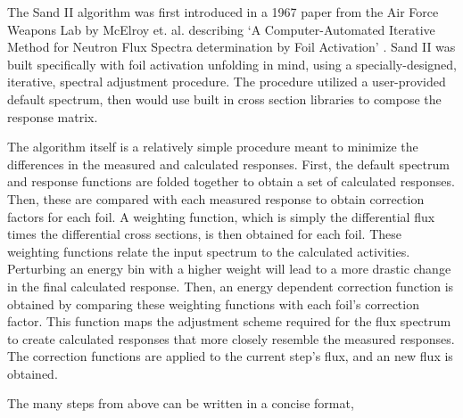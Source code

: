The Sand II algorithm was first introduced in a 1967 paper from the Air Force Weapons Lab by McElroy et. al. describing `A Computer-Automated Iterative Method for Neutron Flux Spectra determination by Foil Activation' \cite{mcelroy1967computer}.
Sand II was built specifically with foil activation unfolding in mind, using a specially-designed, iterative, spectral adjustment procedure.
The procedure utilized a user-provided default spectrum, then would use built in cross section libraries to compose the response matrix.

The algorithm itself is a relatively simple procedure meant to minimize the differences in the measured and calculated responses.
First, the default spectrum and response functions are folded together to obtain a set of calculated responses.
Then, these are compared with each measured response to obtain correction factors for each foil.
A weighting function, which is simply the differential flux times the differential cross sections, is then obtained for each foil.
These weighting functions relate the input spectrum to the calculated activities.
Perturbing an energy bin with a higher weight will lead to a more drastic change in the final calculated response.
Then, an energy dependent correction function is obtained by comparing these weighting functions with each foil's correction factor.
This function maps the adjustment scheme required for the flux spectrum to create calculated responses that more closely resemble the measured responses.
The correction functions are applied to the current step's flux, and an new flux is obtained.

The many steps from above can be written in a concise format,

